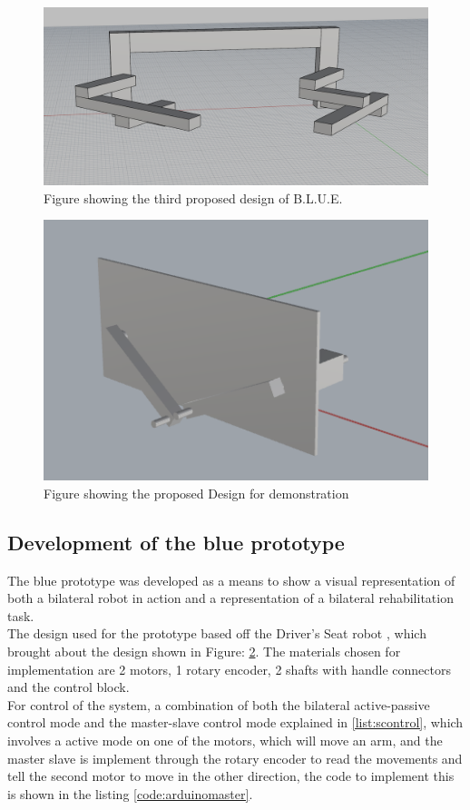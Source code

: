 \begin{figure}[p]%
	\centering
	\includegraphics[width=\linewidth]{figures/ch3/bluedesign3}
	\caption{Figure showing the third proposed design of B.L.U.E.}
	\label{fig:blue3}
\end{figure}
\begin{figure}[p]%
	\centering
	\includegraphics[width=\linewidth]{figures/ch3/bluepres}
	\caption{Figure showing the proposed Design for demonstration}
	\label{fig:bluepres}
\end{figure}
\subsection{Development of the \ac{blue} prototype}
The \ac{blue} prototype was developed as a means to show a visual representation of both a bilateral robot in action and a representation of a bilateral rehabilitation task.\\
The design used for the prototype based off the Driver's Seat robot \cite{Johnson1999,Johnson2003}, which brought about the design shown in Figure: \ref{fig:bluepres}. The materials chosen for implementation are 2 motors, 1 rotary encoder, 2 shafts with handle connectors and the control block.\\
For control of the system, a combination of both the bilateral active-passive control mode and the master-slave control mode explained in \ref{list:scontrol}, which involves a active mode on one of the motors, which will move an arm, and the master slave is implement through the rotary encoder to read the movements and tell the second motor to move in the other direction, the code to implement this is shown in the listing \ref{code:arduinomaster}.
\newpage

